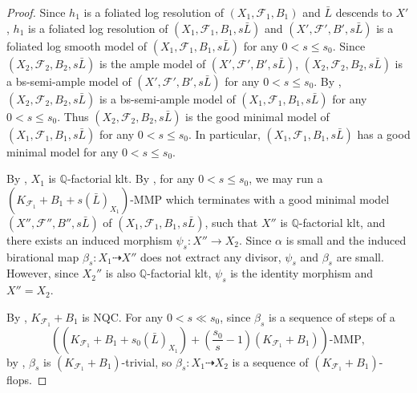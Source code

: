 \documentclass[11pt]{amsart}
\numberwithin{equation}{section}
\newcommand{\Qq}{\mathbb{Q}}
\newcommand{\Ff}{\mathcal{F}}
\theoremstyle{definition}
\theoremstyle{definition}
\theoremstyle{definition}
\begin{document}
\begin{proof}
Since $h_1$ is a foliated log resolution of $(X_1,\Ff_1,B_1)$ and $\bar L$ descends to $X'$, $h_1$ is a foliated log resolution of $(X_1,\Ff_1,B_1,s\bar L)$ and $(X',\Ff',B',s\bar L)$ is a foliated log smooth model of $(X_1,\Ff_1,B_1,s\bar L)$ for any $0<s\leq s_0$. Since $(X_2,\Ff_2,B_2,s\bar L)$ is the ample model of $(X',\Ff',B',s\bar L)$, $(X_2,\Ff_2,B_2,s\bar L)$ is a bs-semi-ample model of $(X',\Ff',B',s\bar L)$ for any $0<s\leq s_0$. By \cite[Lemma 4.11]{LMX24}, $(X_2,\Ff_2,B_2,s\bar L)$ is a bs-semi-ample model of $(X_1,\Ff_1,B_1,s\bar L)$ for any $0<s\leq s_0$. Thus $(X_2,\Ff_2,B_2,s\bar L)$ is the good minimal model of $(X_1,\Ff_1,B_1,s\bar L)$ for any $0<s\leq s_0$. In particular,  $(X_1,\Ff_1,B_1,s\bar L)$ has a good minimal model for any $0<s\leq s_0$. 

By \cite[Theorem 7.2]{LMX24}, $X_1$ is $\Qq$-factorial klt. By \cite[Theorem 1.11, Lemma 4.7]{LMX24}, for any $0<s\leq s_0$, we may run a $(K_{\Ff_1}+B_1+s(\bar L)_{X_1})$-MMP which terminates with a good minimal model $(X'',\Ff'',B'',s\bar L)$ of $(X_1,\Ff_1,B_1,s\bar L)$, such that $X''$ is $\Qq$-factorial klt, and there exists an induced morphism $\psi_s: X''\rightarrow X_2$. Since $\alpha$ is small and the induced birational map $\beta_s: X_1\dashrightarrow X''$ does not extract any divisor, $\psi_s$ and $\beta_s$ are small. However, since $X_2''$ is also $\Qq$-factorial klt, $\psi_s$ is the identity morphism and $X''=X_2$.

By \cite[Theorem 1.12]{LMX24}, $K_{\Ff_1}+B_1$ is NQC. For any $0<s\ll s_0$, since $\beta_s$ is a sequence of steps of a
$$\left((K_{\Ff_1}+B_1+s_0(\bar L)_{X_1})+\left(\frac{s_0}{s}-1\right)(K_{\Ff_1}+B_1)\right)\text{-MMP},$$
by \cite[Lemma B.6]{LMX24}, $\beta_s$ is $(K_{\Ff_1}+B_1)$-trivial, so $\beta_s: X_1\dashrightarrow X_2$ is a sequence of $(K_{\Ff_1}+B_1)$-flops.
\end{proof}
\end{document}
